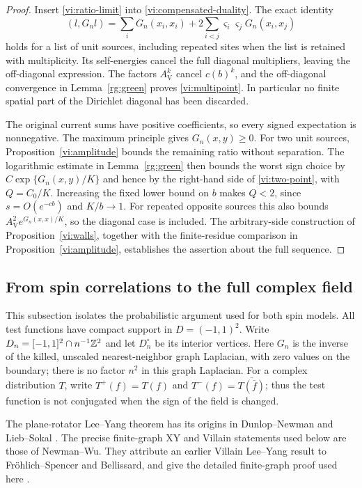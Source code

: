\begin{proof}
Insert \eqref{vi:ratio-limit} into
\eqref{vi:compensated-duality}.  The exact identity
\[
 (l,G_nl)=\sum_iG_n(x_i,x_i)+
                2\sum_{i<j}\varsigma_i\varsigma_jG_n(x_i,x_j)
\]
holds for a list of unit sources, including repeated sites when the
list is retained with multiplicity.  Its self-energies cancel the full
diagonal multipliers, leaving the off-diagonal expression.  The factors
$A_{\mathrm V}^k$ cancel $c(b)^k$, and the off-diagonal convergence in
Lemma~\ref{rg:green} proves \eqref{vi:multipoint}.  In particular no
finite spatial part of the Dirichlet diagonal has been discarded.

The original current sums have positive coefficients, so every signed
expectation is nonnegative.  The maximum principle gives $G_n(x,y)\ge0$.
For two unit sources, Proposition~\ref{vi:amplitude} bounds the remaining
ratio without separation.  The logarithmic estimate in
Lemma~\ref{rg:green} then bounds the worst sign choice by
$C\exp\{G_n(x,y)/K\}$ and hence by the right-hand side of
\eqref{vi:two-point}, with $Q=C_0/K$.  Increasing the fixed lower bound
on $b$ makes $Q<2$, since $s=O(e^{-cb})$ and $K/b\to1$.
For repeated opposite sources this also bounds
$A_{\mathrm V}^2e^{G_n(x,x)/K}$, so the diagonal case is included.
The arbitrary-side construction of Proposition~\ref{vi:walls}, together
with the finite-residue comparison in Proposition~\ref{vi:amplitude},
establishes the assertion about the full sequence.
\end{proof}
\subsection{From spin correlations to the full complex field}

This subsection isolates the probabilistic argument used for both spin models.
All test functions have compact support in $D=(-1,1)^2$.
Write $D_n=[-1,1]^2\cap n^{-1}\mathbb Z^2$ and let $D_n^\circ$ be its
interior vertices.  Here $G_n$ is the inverse of the killed, unscaled
nearest-neighbor graph Laplacian, with zero values on the boundary;
there is no factor $n^2$ in this graph Laplacian.
For a complex distribution $T$, write
$T^+(f)=T(f)$ and $T^-(f)=\overline{T(\overline f)}$;
thus the test function is not conjugated when the sign of the field is changed.

The plane-rotator Lee--Yang theorem has its origins in
Dunlop--Newman and Lieb--Sokal
\citep{DunlopNewman1975,LiebSokal1981}.  The precise finite-graph
XY and Villain statements used below are those of Newman--Wu.
They attribute an earlier Villain Lee--Yang result to Fr\"ohlich--Spencer
\citep{FrohlichSpencerCoulomb1981} and Bellissard, and give the detailed
finite-graph proof used here \citep{NewmanWu2019}.

